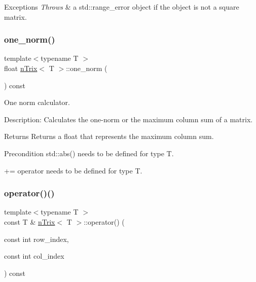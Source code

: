 \begin{DoxyExceptions}{Exceptions}
{\em Throws} & a std\+::range\+\_\+error object if the object is not a square matrix. \\
\hline
\end{DoxyExceptions}
\mbox{\label{classnTrix_afd682a4691502bcdd530c0580b13b05e}} 
\subsubsection{\texorpdfstring{one\+\_\+norm()}{one\_norm()}}
{\footnotesize\ttfamily template$<$typename T $>$ \\
float \hyperlink{classnTrix}{n\+Trix}$<$ T $>$\+::one\+\_\+norm (\begin{DoxyParamCaption}{ }\end{DoxyParamCaption}) const}



One norm calculator. 

Description\+: Calculates the one-\/norm or the maximum column sum of a matrix. \begin{DoxyReturn}{Returns}
Returns a float that represents the maximum column sum. 
\end{DoxyReturn}
\begin{DoxyPrecond}{Precondition}
std\+::abs() needs to be defined for type T. 

+= operator needs to be defined for type T. 
\end{DoxyPrecond}
\mbox{\label{classnTrix_a0b575b4c1a79ba858e081ab8cc53ef20}} 
\subsubsection{\texorpdfstring{operator()()}{operator()()}\hspace{0.1cm}{\footnotesize\ttfamily [1/2]}}
{\footnotesize\ttfamily template$<$typename T $>$ \\
const T \& \hyperlink{classnTrix}{n\+Trix}$<$ T $>$\+::operator() (\begin{DoxyParamCaption}\item[{const int}]{row\+\_\+index,  }\item[{const int}]{col\+\_\+index }\end{DoxyParamCaption}) const}



